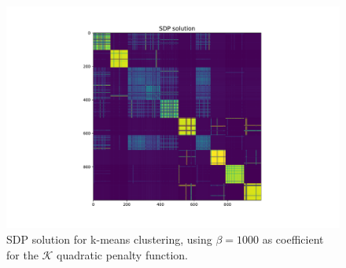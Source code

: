 \documentclass[12pt]{article}
\begin{document}
\begin{figure}[ht]
    \centering
    \includegraphics[width=12cm]{hw4/code/part3/results/beta/heatmap.pdf}
    \caption{SDP solution for k-means clustering, using $\beta = 1000$ as coefficient for the $\mathcal{K}$ quadratic penalty function.}
    \label{fig:beta-heatmap}
\end{figure}
\end{document}
